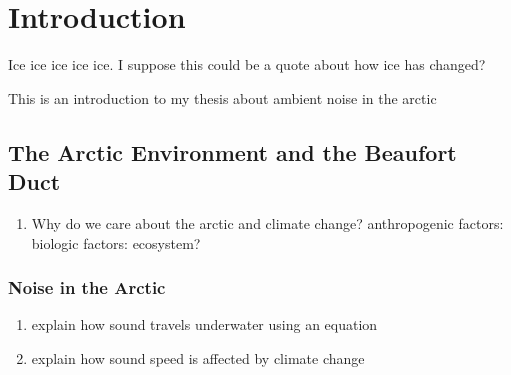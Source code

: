 
\chapter{Introduction}

\begin{center}
  \begin{minipage}{0.5\textwidth}
    \begin{small}
      Ice ice ice ice ice. I suppose this could be a quote about how ice has changed?
    \end{small}
  \end{minipage}
  \vspace{0.5cm}
\end{center}

\noindent This is an introduction to my thesis about ambient noise in the arctic

\section{The Arctic Environment and the Beaufort Duct}

\begin{enumerate}
\item Why do we care about the arctic and climate change?
anthropogenic factors:
biologic factors:
ecosystem?

\end{enumerate}



\subsection{Noise in the Arctic}
\begin{enumerate}
\item explain how sound travels underwater using an equation

\item explain how sound speed is affected by climate change
\end{enumerate}


